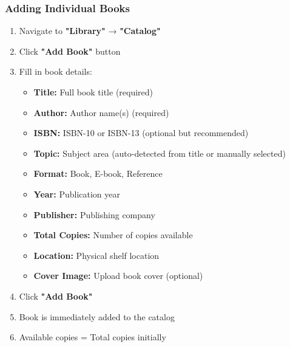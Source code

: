 \documentclass[12pt,a4paper]{article}
\begin{document}
\subsubsection{Adding Individual Books}
\begin{enumerate}[leftmargin=*]
    \item Navigate to \textbf{"Library"} → \textbf{"Catalog"}
    \item Click \textbf{"Add Book"} button
    \item Fill in book details:
        \begin{itemize}
            \item \textbf{Title:} Full book title (required)
            \item \textbf{Author:} Author name(s) (required)
            \item \textbf{ISBN:} ISBN-10 or ISBN-13 (optional but recommended)
            \item \textbf{Topic:} Subject area (auto-detected from title or manually selected)
            \item \textbf{Format:} Book, E-book, Reference
            \item \textbf{Year:} Publication year
            \item \textbf{Publisher:} Publishing company
            \item \textbf{Total Copies:} Number of copies available
            \item \textbf{Location:} Physical shelf location
            \item \textbf{Cover Image:} Upload book cover (optional)
        \end{itemize}
    \item Click \textbf{"Add Book"}
    \item Book is immediately added to the catalog
    \item Available copies = Total copies initially
\end{enumerate}
\end{document}
